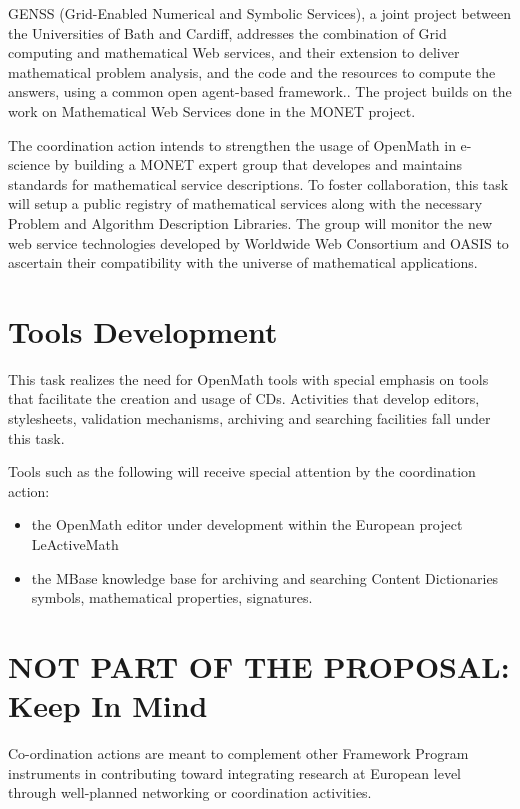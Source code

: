 \documentclass[draft]{artikel3}
\begin{document}
GENSS (Grid-Enabled Numerical and Symbolic Services), a joint project
between the Universities of Bath and Cardiff, addresses the
combination of Grid computing and mathematical Web services, and their
extension to deliver mathematical problem analysis, and the code and
the resources to compute the answers, using a common open agent-based
framework.. The project builds on the work on Mathematical Web
Services done in the MONET project.

The coordination action intends to strengthen the usage of OpenMath in
e-science by building a MONET expert group that developes and
maintains standards for mathematical service descriptions. To foster
collaboration, this task will setup a public registry of mathematical
services along with the necessary Problem and Algorithm Description
Libraries.  The group will monitor the new web service technologies
developed by Worldwide Web Consortium and OASIS to ascertain their
compatibility with the universe of mathematical applications.


\section{Tools Development} 
\label{tools}

This task realizes the need for OpenMath tools with special emphasis
on tools that facilitate the creation and usage of CDs. Activities
that develop editors, stylesheets, validation mechanisms, archiving
and searching facilities fall under this task.

Tools such as the following will receive special attention by the
coordination action: 
\begin{itemize}
\item the OpenMath editor under development within the European
  project LeActiveMath
\item the MBase knowledge base for archiving and searching Content
  Dictionaries symbols, mathematical properties, signatures.


\end{itemize}



\newpage

\section{NOT PART OF THE PROPOSAL:  Keep In Mind}
Co-ordination actions are meant to complement other Framework Program
instruments in contributing toward integrating research at European
level through well-planned networking or coordination activities.
\end{document}
